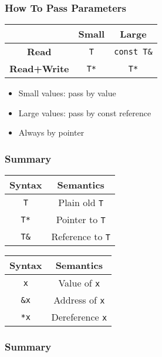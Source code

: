 \begin{frame}
  \frametitle{How To Pass Parameters}
  \begin{center}
    \begin{tabular}{ccc}
      & \textbf{Small} & \textbf{Large} \\
      \toprule
      \textbf{Read} & \texttt{T} & \texttt{const T\&} \\
      \textbf{Read+Write} & \texttt{T*} & \texttt{T*} \\
    \end{tabular}
  \end{center}
  \vskip4mm
  \begin{itemize}
    \item Small values: pass by value
    \item Large values: pass by const reference
  \end{itemize}
  \vskip4mm
  \begin{itemize}
    \item Always by pointer
  \end{itemize}
\end{frame}

\begin{frame}
  \frametitle{Summary}
  \begin{center}
    \begin{tabular}{cc}
      \textbf{Syntax} & \textbf{Semantics} \\
      \toprule
      \texttt{T} & Plain old \texttt{T} \\
      \texttt{T*} & Pointer to \texttt{T} \\
      \texttt{T\&} & Reference to \texttt{T} \\
    \end{tabular}
  \end{center}
  \vskip4mm
  \begin{center}
    \begin{tabular}{cc}
      \textbf{Syntax} & \textbf{Semantics} \\
      \toprule
      \texttt{x} & Value of \texttt{x} \\
      \texttt{\&x} & Address of \texttt{x} \\
      \texttt{*x} & Dereference \texttt{x}
    \end{tabular}
  \end{center}
\end{frame}

\begin{frame}
  \frametitle{Summary}
\end{frame}




